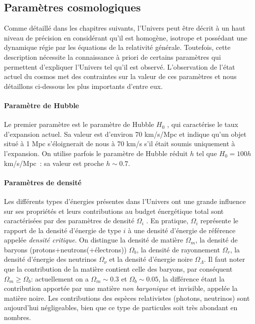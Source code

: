 \subsection{Paramètres cosmologiques}
Comme détaillé dans les chapitres suivants, l'Univers peut être décrit à un haut niveau de précision en considérant qu'il est homogène, isotrope et possédant une dynamique régie par les équations de la relativité générale. Toutefois, cette description nécessite la connaissance à priori de certains paramètres qui permettent d'expliquer l'Univers tel qu'il est observé. L'observation de l'état actuel du cosmos met des contraintes sur la valeur de ces paramètres et nous détaillons ci-dessous les plus importants d'entre eux.

\paragraph{Paramètre de Hubble} Le premier paramètre est le paramètre de Hubble $H_0$ , qui caractérise le taux d'expansion actuel. Sa valeur est d'environ 70 km/s/Mpc et indique qu'un objet situé à 1 Mpc s'éloignerait de nous à 70 km/s s'il était soumis uniquement à l'expansion. On utilise parfois le paramètre de Hubble réduit $h$ tel que $H_0=100 h$ km/s/Mpc~: sa valeur est proche $h\sim 0.7$.

\paragraph{Paramètres de densité} Les différents types d'énergies présentes dans l'Univers ont une grande influence sur ses propriétés et leurs contributions au budget énergétique total sont caractérisées par des paramètres de densité $\Omega_i$ . En pratique, $\Omega_i$ représente le rapport de la densité d'énergie de type $i$ à une densité d'énergie de référence appelée \textit{densité critique}. On distingue la densité de matière $\Omega_m$, la densité de baryons (protons+neutrons(+électrons)) $\Omega_b$, la densité de rayonnement $\Omega_r$, la densité d'énergie des neutrinos $\Omega_\nu$ et la densité d'énergie noire $\Omega_\Lambda$. Il faut noter que la contribution de la matière contient celle des baryons, par conséquent $\Omega_m\ge\Omega_b$: actuellement on a $\Omega_m\sim 0.3$ et $\Omega_b\sim 0.05$, la différence étant la contribution apportée par une matière \textit{non baryonique} et invisible, appelée la matière noire. Les contributions des espèces relativistes (photons, neutrinos) sont aujourd'hui négligeables, bien que ce type de particules soit très abondant en nombres.

